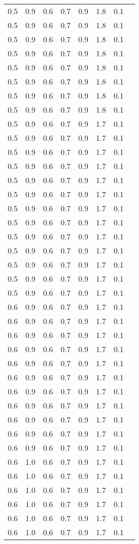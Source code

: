 \begin{tabular}{L{1in}|L{1in}|L{1in}|L{1in}|L{1in}|L{1in}|L{1in}|L{1in}}
0.5&0.9&0.6&0.7&0.9&1.8&0.1\\
0.5&0.9&0.6&0.7&0.9&1.8&0.1\\
0.5&0.9&0.6&0.7&0.9&1.8&0.1\\
0.5&0.9&0.6&0.7&0.9&1.8&0.1\\
0.5&0.9&0.6&0.7&0.9&1.8&0.1\\
0.5&0.9&0.6&0.7&0.9&1.8&0.1\\
0.5&0.9&0.6&0.7&0.9&1.8&0.1\\
0.5&0.9&0.6&0.7&0.9&1.8&0.1\\
0.5&0.9&0.6&0.7&0.9&1.7&0.1\\
0.5&0.9&0.6&0.7&0.9&1.7&0.1\\
0.5&0.9&0.6&0.7&0.9&1.7&0.1\\
0.5&0.9&0.6&0.7&0.9&1.7&0.1\\
0.5&0.9&0.6&0.7&0.9&1.7&0.1\\
0.5&0.9&0.6&0.7&0.9&1.7&0.1\\
0.5&0.9&0.6&0.7&0.9&1.7&0.1\\
0.5&0.9&0.6&0.7&0.9&1.7&0.1\\
0.5&0.9&0.6&0.7&0.9&1.7&0.1\\
0.5&0.9&0.6&0.7&0.9&1.7&0.1\\
0.5&0.9&0.6&0.7&0.9&1.7&0.1\\
0.5&0.9&0.6&0.7&0.9&1.7&0.1\\
0.5&0.9&0.6&0.7&0.9&1.7&0.1\\
0.6&0.9&0.6&0.7&0.9&1.7&0.1\\
0.6&0.9&0.6&0.7&0.9&1.7&0.1\\
0.6&0.9&0.6&0.7&0.9&1.7&0.1\\
0.6&0.9&0.6&0.7&0.9&1.7&0.1\\
0.6&0.9&0.6&0.7&0.9&1.7&0.1\\
0.6&0.9&0.6&0.7&0.9&1.7&0.1\\
0.6&0.9&0.6&0.7&0.9&1.7&0.1\\
0.6&0.9&0.6&0.7&0.9&1.7&0.1\\
0.6&0.9&0.6&0.7&0.9&1.7&0.1\\
0.6&0.9&0.6&0.7&0.9&1.7&0.1\\
0.6&0.9&0.6&0.7&0.9&1.7&0.1\\
0.6&1.0&0.6&0.7&0.9&1.7&0.1\\
0.6&1.0&0.6&0.7&0.9&1.7&0.1\\
0.6&1.0&0.6&0.7&0.9&1.7&0.1\\
0.6&1.0&0.6&0.7&0.9&1.7&0.1\\
0.6&1.0&0.6&0.7&0.9&1.7&0.1\\
0.6&1.0&0.6&0.7&0.9&1.7&0.1\\

\end{tabular}

